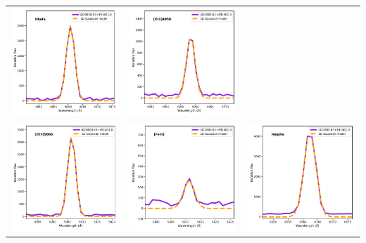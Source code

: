 \documentclass[fleqn,usenatbib]{mnras}
\begin{document}
\begin{table}
\begin{tabular}{l l l }
    \includegraphics[width=0.3\linewidth, clip]{Figs/Obs_Hbeta.pdf} & \includegraphics[width=0.3\linewidth,
      clip]{Figs/Obs_[OIII]4958.pdf} \\ \includegraphics[width=0.3\linewidth, clip]{Figs/Obs_[OIII]5006.pdf} &
    \includegraphics[width=0.3\linewidth, clip]{Figs/Obs_[FeIII].pdf} &
    \includegraphics[width=0.3\linewidth, clip]{Figs/Obs_Halpha.pdf} \\
\end{tabular}
\end{table}




\bsp	%
\label{lastpage}
\end{document}

